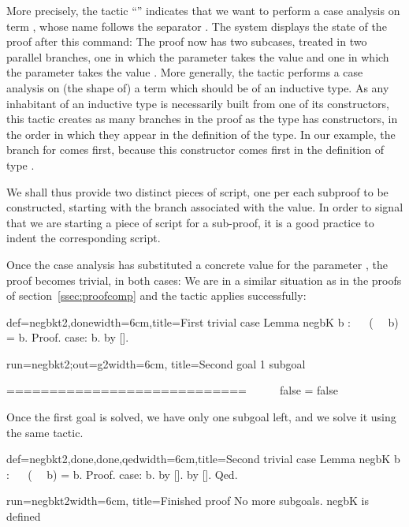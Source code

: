 More precisely, the tactic ``'' indicates that we want to
perform a case analysis on term , whose
name follows the separator \C{:}. The \Coq{} system displays the state
of the proof after this command: The proof now has two subcases,
treated in two parallel branches, one in which the parameter 
takes the value  and one in which the parameter  takes
the value . More generally, the  tactic performs a
case analysis on (the shape of) a term  which should be of an
inductive type. As any inhabitant of an inductive type is necessarily
built from one of its constructors, this tactic creates as many
branches in the proof as the type has constructors, in the order in
which they appear in the definition of the type. In our example, the
branch for  comes first, because this constructor comes first
in the definition of type .

We shall thus provide two distinct pieces of
script, one per each subproof to be constructed,
starting with the branch associated with the  value. In order
to signal that we are starting a piece of script for a sub-proof, it
is a good practice to indent the corresponding script.

Once the case analysis has substituted a concrete value for the
parameter , the proof becomes trivial, in both cases: We are in a
similar situation as in the proofs of section~\ref{ssec:proofcomp} and
the tactic  applies successfully:

\begin{coq}{def=negbkt2,done}{width=6cm,title=First trivial case}
Lemma negbK b : ~~ (~~ b) = b.
Proof.
case: b.
  by [].
\end{coq}
\begin{coqout}{run=negbkt2;out=g2}{width=6cm, title=Second goal}
1 subgoal

 ============================
   ~~ ~~ false = false
\end{coqout}

Once the first goal is solved, we have only one subgoal left, and
we solve it using the same tactic.

\begin{coq}{def=negbkt2,done,done,qed}{width=6cm,title=Second trivial case}
Lemma negbK b : ~~ (~~ b) = b.
Proof.
case: b.
  by [].
by [].
Qed.
\end{coq}
\begin{coqout}{run=negbkt2}{width=6cm, title=Finished proof}
No more subgoals.
negbK is defined
$~$
$~$
$~$
$~$
\end{coqout}

